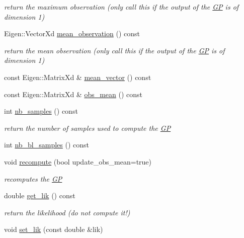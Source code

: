 \begin{DoxyCompactItemize}
\begin{DoxyCompactList}\small\item\em return the maximum observation (only call this if the output of the \hyperlink{classlimbo_1_1model_1_1_g_p}{G\+P} is of dimension 1) \end{DoxyCompactList}\item 
Eigen\+::\+Vector\+Xd \hyperlink{classlimbo_1_1model_1_1_g_p_a802d8d4750626e6d38d83d36166000ac}{mean\+\_\+observation} () const 
\begin{DoxyCompactList}\small\item\em return the mean observation (only call this if the output of the \hyperlink{classlimbo_1_1model_1_1_g_p}{G\+P} is of dimension 1) \end{DoxyCompactList}\item 
const Eigen\+::\+Matrix\+Xd \& \hyperlink{classlimbo_1_1model_1_1_g_p_ade0d93b847e3d112735b3e8143470a55}{mean\+\_\+vector} () const 
\item 
const Eigen\+::\+Matrix\+Xd \& \hyperlink{classlimbo_1_1model_1_1_g_p_aa9d3799fdcd71a8ccc19bc43932fa321}{obs\+\_\+mean} () const 
\item 
int \hyperlink{classlimbo_1_1model_1_1_g_p_ac490915c95cc78f6cd836f78e3638bf1}{nb\+\_\+samples} () const 
\begin{DoxyCompactList}\small\item\em return the number of samples used to compute the \hyperlink{classlimbo_1_1model_1_1_g_p}{G\+P} \end{DoxyCompactList}\item 
int \hyperlink{classlimbo_1_1model_1_1_g_p_aa41665d2029a541ce5fe85647fe3662d}{nb\+\_\+bl\+\_\+samples} () const 
\item 
void \hyperlink{classlimbo_1_1model_1_1_g_p_a55ea6fe353a12d4c788fac5f2e20e416}{recompute} (bool update\+\_\+obs\+\_\+mean=true)
\begin{DoxyCompactList}\small\item\em recomputes the \hyperlink{classlimbo_1_1model_1_1_g_p}{G\+P} \end{DoxyCompactList}\item 
double \hyperlink{classlimbo_1_1model_1_1_g_p_a794ed0eeda29aaa7afe303b5e72d3927}{get\+\_\+lik} () const 
\begin{DoxyCompactList}\small\item\em return the likelihood (do not compute it!) \end{DoxyCompactList}\item 
void \hyperlink{classlimbo_1_1model_1_1_g_p_a4dfc1807eb4f113191dbd3ae51c053ee}{set\+\_\+lik} (const double \&lik)

\end{DoxyCompactItemize}
